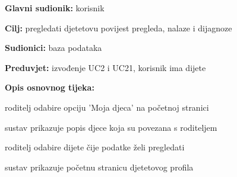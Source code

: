                     \noindent {}
					\begin{packed_item}
	
						\item \textbf{Glavni sudionik: }korisnik
						\item  \textbf{Cilj:} pregledati djetetovu povijest pregleda, nalaze i dijagnoze
						\item  \textbf{Sudionici:} baza podataka
						\item  \textbf{Preduvjet:} izvođenje UC2 i UC21, korisnik ima dijete
						\item  \textbf{Opis osnovnog tijeka:}
						
						\item[] \begin{packed_enum}
		
							\item roditelj odabire opciju 'Moja djeca' na početnoj stranici
							\item sustav prikazuje popis djece koja su povezana s roditeljem
							\item roditelj odabire dijete čije podatke želi pregledati
							\item sustav prikazuje početnu stranicu djetetovog profila
							
						\end{packed_enum}
						
					\end{packed_item}

